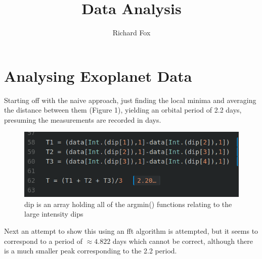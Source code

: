 \documentclass[a4paper,12pt,notitlepage]{article}
\title{Data Analysis}
\author{Richard Fox}
\date{}
\begin{document}
\maketitle

\section{Analysing Exoplanet Data}

Starting off with the naive approach, just finding the local minima and averaging the distance between them (Figure 1), yielding an orbital period of 2.2 days, presuming the measurements are recorded in days. 

\begin{figure}[h]
    \centering
    \includegraphics[width=\textwidth]{Period.png}
    \caption{dip is an array holding all of the argmin() functions relating to the large intensity dips}
    \label{fig:my_label}
\end{figure}

Next an attempt to show this using an fft algorithm is attempted, but it seems to correspond to a period of $\approx 4.822$ days which cannot be correct, although there is a much smaller peak corresponding to  the 2.2 period.
\end{document}
